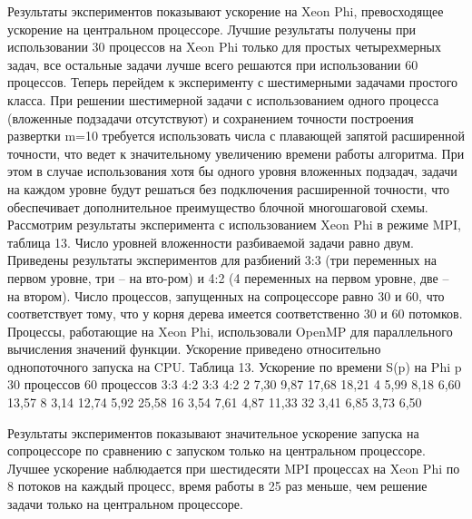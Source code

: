 Результаты экспериментов показывают ускорение на Xeon Phi, превосходящее ускорение на центральном процессоре. Лучшие результаты получены при использовании 30 процессов на Xeon Phi только для простых четырехмерных задач, все остальные задачи лучше всего решаются при использовании 60 процессов.
Теперь перейдем к эксперименту с шестимерными задачами простого класса. При решении шестимерной задачи с использованием одного процесса (вложенные подзадачи отсутствуют) и сохранением точности построения развертки m=10 требуется использовать числа с плавающей запятой расширенной точности, что ведет к значительному увеличению времени работы алгоритма. При этом в случае использования хотя бы одного уровня вложенных подзадач, задачи на каждом уровне будут решаться без подключения расширенной точности, что обеспечивает дополнительное преимущество блочной многошаговой схемы.
Рассмотрим результаты эксперимента с использованием Xeon Phi в режиме MPI, таблица 13. Число уровней вложенности разбиваемой задачи равно двум. Приведены результаты экспериментов для разбиений 3:3 (три переменных на первом уровне, три – на вто-ром) и 4:2 (4 переменных на первом уровне, две – на втором). Число процессов, запущенных на сопроцессоре равно 30 и 60, что соответствует тому, что у корня дерева имеется соответственно 30 и 60 потомков. Процессы, работающие на Xeon Phi, использовали OpenMP для параллельного вычисления значений функции. Ускорение приведено относительно однопоточного запуска на CPU.
Таблица 13. Ускорение по времени S(p) на Phi
p	30 процессов	60 процессов
	3:3	4:2	3:3	4:2
2	7,30	9,87	17,68	18,21
4	5,99	8,18	6,60	13,57
8	3,14	12,74	5,92	25,58
16	3,54	7,61	4,87	11,33
32	3,41	6,85	3,73	6,50

Результаты экспериментов показывают значительное ускорение запуска на сопроцессоре по сравнению с запуском только на центральном процессоре. Лучшее ускорение наблюдается при шестидесяти MPI процессах на Xeon Phi по 8 потоков на каждый процесс, время работы в 25 раз меньше, чем решение задачи только на центральном процессоре.
